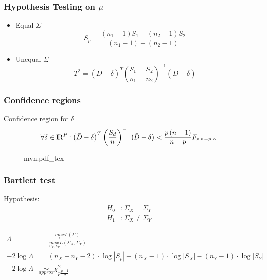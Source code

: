 \documentclass[aspectratio=169,10pt,t]{beamer}
\begin{document}
\begin{frame}[t]
	\frametitle{Hypothesis Testing on $\mu$}
	\begin{itemize}
		\item Equal $\Sigma$\\
			\[
				S_p = 
				\frac{  \left( n_1 -1  \right) S_1 +  \left( n_2 -1  \right) S_2}
				{ \left( n_1 -1  \right) +  \left( n_2 -1  \right) } 
			\] 
		\item Unequal $\Sigma$
			\[
				T^{2} =
				\left( \bar{D} - \delta  \right) ^{T}
				\left( \frac{S_1}{n_1} + \frac{S_2}{n_2}  \right) ^{-1}
				\left( \bar{D} - \delta  \right)
			\] 
	\end{itemize}
\end{frame}
\begin{frame}[t]
	\frametitle{Confidence regions}
	Confidence region for $\delta$
	\[
		\forall \delta \in {\rm I\!R}^{P}:
		\left( \bar{D} - \delta  \right) ^{T}
		\left( \frac{S_d}{n}  \right) ^{-1}
		\left( \bar{D} - \delta  \right)
		<
		\frac{p  \left( n-1 \right) }{n-p} 
		F_{p,n-p,\alpha}
	\] 
	\begin{figure}[h]
		\centering
		{mvn.pdf_tex}
	\end{figure}
\end{frame}

\begin{frame}[t]
	\frametitle{Bartlett test}
	Hypothesis:
	\[
		\begin{aligned}
			H_0 &: \Sigma_X = \Sigma_Y\\
			H_1 &: \Sigma_X \neq \Sigma_Y
		\end{aligned}
	\] 

	\[
		\begin{aligned}
			\Lambda &= \frac{
				\underset{\Sigma}{max}L \left( \Sigma \right) 
				}{
				\underset{\Sigma_X,\Sigma_Y}{max}L  \left( \Sigma_X,\Sigma_Y  \right) 
			} \\
			-2 \log  \Lambda
	&=
	\left( n_{X} + n_{Y} -2  \right) \cdot \log  |S_{p}| 
	-  \left( n_{X} -1  \right) \cdot \log |S_{X}|
	-  \left( n_{Y} -1  \right) \cdot \log |S_{Y}|\\
	-2 \log  \Lambda
	& \underset{approx}{\sim}
	\chi^{2}_{p \frac{p+1}{2} }
	\end{aligned}
\] 

\end{frame}
\end{document}
